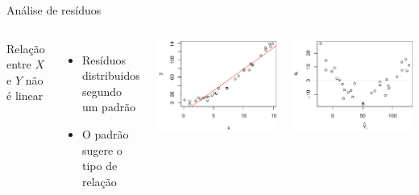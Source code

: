 \documentclass{beamer}\usepackage[]{graphicx}\usepackage[]{color}
\newenvironment{knitrout}{}{} %
\renewenvironment{knitrout}{\setlength{\topsep}{0mm}}{}
\begin{document}
\begin{frame}{Análise de resíduos}

\begin{columns}[c]

\small


Relação entre $X$ e $Y$ não é linear \pause

\bigskip
\begin{itemize}
\item Resíduos distribuidos segundo um padrão
\item O padrão sugere o tipo de relação
\end{itemize}


\begin{knitrout}
\color{fgcolor}
\includegraphics[width=1\linewidth]{figure/r11-1} 

\includegraphics[width=1\linewidth]{figure/r11-2} 

\end{knitrout}
\end{columns}

\end{frame}
\end{document}
